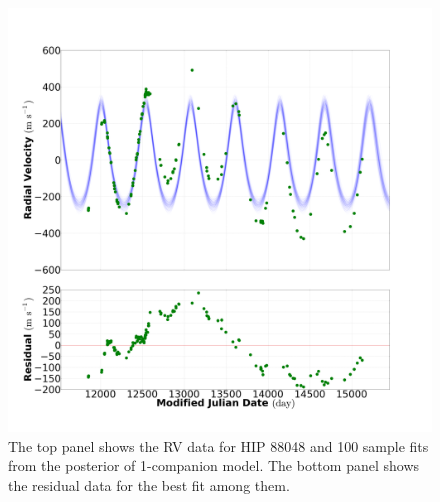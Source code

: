 \documentclass[letterpaper, preprint]{aastex}
\begin{document}

\begin{figure}
 \includegraphics[width=0.99\linewidth]{fit_res_282_mod_1_20130930.png}
 \caption{The top panel shows the RV data for HIP 88048 and 100 sample fits from the posterior of 1-companion model. The bottom panel shows the residual data for the best fit among them.}
 \label{fig:282-1-fit}
\end{figure}
\end{document}
